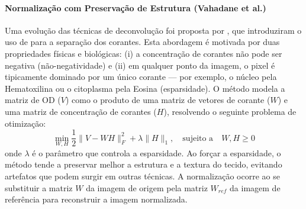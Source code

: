 \paragraph{Normalização com Preservação de Estrutura (Vahadane et al.)}
Uma evolução das técnicas de deconvolução foi proposta por \textcite{Vahadane2016}, que introduziram o uso de  para a separação dos corantes. Esta abordagem é motivada por duas propriedades físicas e biológicas: (i) a concentração de corantes não pode ser negativa (não-negatividade) e (ii) em qualquer ponto da imagem, o pixel é tipicamente dominado por um único corante — por exemplo, o núcleo pela Hematoxilina ou o citoplasma pela Eosina (esparsidade).
O método modela a matriz de OD ($V$) como o produto de uma matriz de vetores de corante ($W$) e uma matriz de concentração de corantes ($H$), resolvendo o seguinte problema de otimização:
\begin{equation}
    \min_{W,H} \frac{1}{2} \|V - WH\|_F^2 + \lambda \|H\|_1, \quad \text{sujeito a} \quad W, H \ge 0
\end{equation}
onde $\lambda$ é o parâmetro que controla a esparsidade. Ao forçar a esparsidade, o método tende a preservar melhor a estrutura e a textura do tecido, evitando artefatos que podem surgir em outras técnicas. A normalização ocorre ao se substituir a matriz $W$ da imagem de origem pela matriz $W_{ref}$ da imagem de referência para reconstruir a imagem normalizada.

